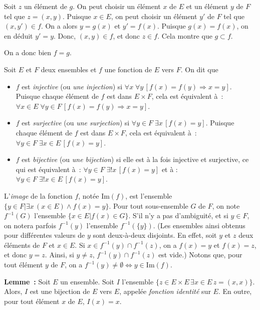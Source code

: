     Soit $z$ un élément de $g$. 
    On peut choisir un élément $x$ de $E$ et un élément $y$ de $F$ tel que $z = (x,y)$. 
    Puisque $x \in E$, on peut choisir un élément $y'$ de $F$ tel que $(x,y') \in f$. 
    On a alors $y = g(x)$ et $y' = f(x)$. 
    Puisque $g(x) = f(x)$, on en déduit $y' = y$. 
    Donc, $(x,y) \in f$, et donc $z \in f$. 
    Cela montre que $g \subset f$.

    On a donc bien $f = g$. 

   \done 

\medskip

Soit $E$ et $F$ deux ensembles et $f$ une fonction de $E$ vers $F$. 
On dit que
\begin{itemize}[nosep]
    \item $f$ est \textit{injective} (ou \textit{une injection}) si $\forall x \; \forall y \, [f(x) = f(y) \Rightarrow x = y]$.
        Puisque chaque élément de $f$ est dans $E \times F$, cela est équivalent à : $\forall x \in E \; \forall y \in F \, [f(x) = f(y) \Rightarrow x = y]$.
    \item $f$ est \textit{surjective} (ou \textit{une surjection}) si $\forall y \in F \; \exists x \, [f(x) = y]$.
        Puisque chaque élément de $f$ est dans $E \times F$, cela est équivalent à : $\forall y \in F \; \exists x \in E \, [f(x) = y]$.
    \item $f$ est \textit{bijective} (ou \textit{une bijection}) si elle est à la fois injective et surjective, ce qui est équivalent à : $\forall y \in F \; \exists ! x \, [f(x) = y]$ et à : $\forall y \in F \; \exists ! x \in E \, [f(x) = y]$.
\end{itemize}
L'\textit{image} de la fonction $f$, notée $\mathrm{Im}(f)$, est l'ensemble $\lbrace y \in F \vert \exists x \, (x \in E) \wedge f(x) = y \rbrace$. 
Pour tout sous-ensemble $G$ de $F$, on note $f^{-1}(G)$ l'ensemble $\lbrace x \in E \vert f(x) \in G \rbrace$. 
S'il n'y a pas d'ambiguité, et si $y \in F$, on notera parfois $f^{-1}(y)$ l'ensemble $f^{-1}(\lbrace y \rbrace)$.
(Les ensembles ainsi obtenus pour différentes valeurs de $y$ sont deux-à-deux disjoints. 
En effet, soit $y$ et $z$ deux éléments de $F$ et $x \in E$. 
Si $x \in f^{-1}(y) \cap f^{-1}(z)$, on a $f(x) = y$ et $f(x) = z$, et donc $y = z$. 
Ainsi, si $y \neq z$, $f^{-1}(y) \cap f^{-1}(z)$ est vide.)
Notons que, pour tout élément $y$ de $F$, on a $f^{-1}(y) \neq \emptyset \Leftrightarrow y \in \mathrm{Im}(f)$. 

\medskip

\noindent\textbf{Lemme :} Soit $E$ un ensemble. 
    Soit $I$ l'ensemble $\lbrace z \in E \times E \, \exists x \in E \, z = (x,x) \rbrace$. 
    Alors, $I$ est une bijection de $E$ vers $E$, appelée \textit{fonction identité} sur $E$. 
    En outre, pour tout élément $x$ de $E$, $I(x) = x$.

